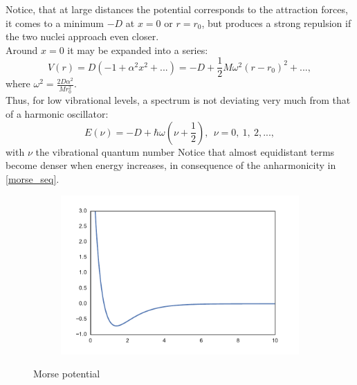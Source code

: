 \documentclass[a4paper, 12pt]{article}
\begin{document}
Notice, that at large distances the potential corresponds to the attraction forces, it comes to a minimum $-D$ at $x=0$ or $r=r_0$, but produces a strong repulsion if the two nuclei approach even closer.\\
Around $x=0$ it may be expanded into a series:
\begin{equation}\label{morse_seq}
V(r) = D(-1 + \alpha^2 x^2+...) = -D + \frac{1}{2}M \omega^2(r-r_0)^2 +...,
\end{equation}
where $\omega^2 = \frac{2D \alpha^2}{M r_0^2}.$\\
Thus, for low vibrational levels, a spectrum is not
deviating very much from that of a harmonic oscillator:
$$E (\nu) = -D + \hbar \omega (\nu + \frac{1}{2}),~~\nu = 0,~1,~2, ...,$$
with $\nu$ the vibrational quantum number Notice that almost equidistant terms become denser when energy increases, in consequence of the anharmonicity  in \ref{morse_seq}. 
\begin{figure}[h!]
	\centering
	\begin{subfigure}{.5\textwidth}
		\centering
		\includegraphics[width=1.0\linewidth]{morse_pot.pdf}
	\end{subfigure}
	\caption{Morse potential}
\end{figure}
\end{document}
